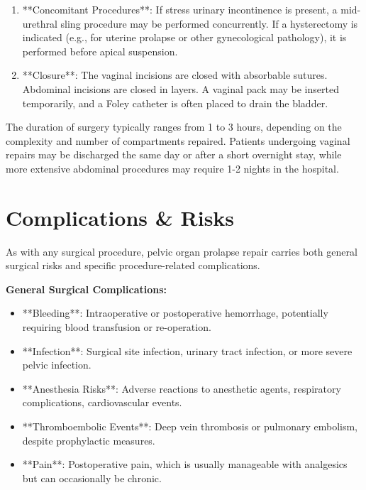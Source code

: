 \begin{enumerate}
  \item **Concomitant Procedures**: If stress urinary incontinence is present, a mid-urethral sling procedure may be performed concurrently. If a hysterectomy is indicated (e.g., for uterine prolapse or other gynecological pathology), it is performed before apical suspension.
  
  \item **Closure**: The vaginal incisions are closed with absorbable sutures. Abdominal incisions are closed in layers. A vaginal pack may be inserted temporarily, and a Foley catheter is often placed to drain the bladder.
\end{enumerate}

The duration of surgery typically ranges from 1 to 3 hours, depending on the complexity and number of compartments repaired. Patients undergoing vaginal repairs may be discharged the same day or after a short overnight stay, while more extensive abdominal procedures may require 1-2 nights in the hospital.

\section*{Complications \& Risks}
As with any surgical procedure, pelvic organ prolapse repair carries both general surgical risks and specific procedure-related complications.

\textbf{General Surgical Complications:}
\begin{itemize}
  \item **Bleeding**: Intraoperative or postoperative hemorrhage, potentially requiring blood transfusion or re-operation.
  \item **Infection**: Surgical site infection, urinary tract infection, or more severe pelvic infection.
  \item **Anesthesia Risks**: Adverse reactions to anesthetic agents, respiratory complications, cardiovascular events.
  \item **Thromboembolic Events**: Deep vein thrombosis or pulmonary embolism, despite prophylactic measures.
  \item **Pain**: Postoperative pain, which is usually manageable with analgesics but can occasionally be chronic.
\end{itemize}

